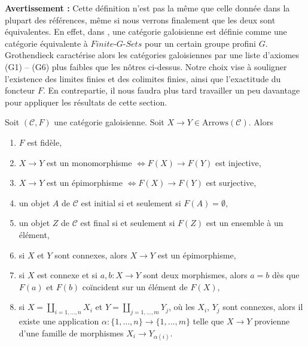 \noindent
{\bf Avertissement :} Cette définition n'est pas la même que celle donnée dans la plupart
des références, même si nous verrons finalement que les deux sont équivalentes.
En effet, dans \cite[Expos\'e V, Définition 5.1]{SGA1}, une catégorie galoisienne est
définie comme une catégorie équivalente à $\textit{Finite-}G\textit{-Sets}$
pour un certain groupe profini $G$. Grothendieck caractérise alors les
catégories galoisiennes par une liste d'axiomes (G1) -- (G6) plus faibles
que les nôtres ci-dessus. Notre choix vise à souligner
l'existence des limites finies et des colimites finies, ainsi que l'exactitude du
foncteur $F$. En contrepartie, il nous faudra plus tard travailler
un peu davantage pour appliquer les résultats de cette section.

\begin{lemma}
\label{lemma-epi-mono}
Soit $(\mathcal{C}, F)$ une catégorie galoisienne. Soit
$X \to Y \in \text{Arrows}(\mathcal{C})$. Alors
\begin{enumerate}
\item $F$ est fidèle,
\item $X \to Y$ est un monomorphisme
$\Leftrightarrow F(X) \to F(Y)$ est injective,
\item $X \to Y$ est un épimorphisme
$\Leftrightarrow F(X) \to F(Y)$ est surjective,
\item un objet $A$ de $\mathcal{C}$ est initial si et seulement si
$F(A) = \emptyset$,
\item un objet $Z$ de $\mathcal{C}$ est final si et seulement si
$F(Z)$ est un ensemble à un élément,
\item si $X$ et $Y$ sont connexes, alors $X \to Y$ est un épimorphisme,
\item
\label{item-one-element}
si $X$ est connexe et si $a, b : X \to Y$ sont deux morphismes,
alors $a = b$ dès que $F(a)$ et $F(b)$ coïncident sur un élément de $F(X)$,
\item si $X = \coprod_{i = 1, \ldots, n} X_i$ et
$Y = \coprod_{j = 1, \ldots, m} Y_j$, où les $X_i$, $Y_j$ sont connexes,
alors il existe une application $\alpha : \{1, \ldots, n\} \to \{1, \ldots, m\}$
telle que $X \to Y$ provienne d'une famille de morphismes
$X_i \to Y_{\alpha(i)}$.
\end{enumerate}
\end{lemma}

